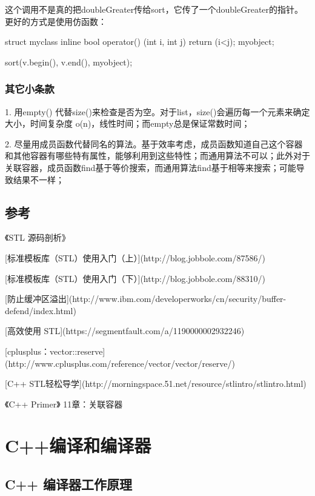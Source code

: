 这个调用不是真的把doubleGreater传给sort，它传了一个doubleGreater的指针。更好的方式是使用仿函数：

\begin{Code}
struct myclass {
	inline bool operator() (int i, int j) {
		return (i<j);
	}
} myobject;

sort(v.begin(), v.end(), myobject);
\end{Code}

\subsubsection {其它小条款}

1. 用empty()
 代替size()来检查是否为空。对于list，size()会遍历每一个元素来确定大小，时间复杂度 o(n)，线性时间；而empty总是保证常数时间；
 
2. 尽量用成员函数代替同名的算法。基于效率考虑，成员函数知道自己这个容器和其他容器有哪些特有属性，能够利用到这些特性；而通用算法不可以；此外对于关联容器，成员函数find基于等价搜索，而通用算法find基于相等来搜索；可能导致结果不一样；

\subsection{参考}  

《STL 源码剖析》  

[标准模板库（STL）使用入门（上）](http://blog.jobbole.com/87586/)
  
[标准模板库（STL）使用入门（下）](http://blog.jobbole.com/88310/) 

[防止缓冲区溢出](http://www.ibm.com/developerworks/cn/security/buffer-defend/index.html)

[高效使用 STL](https://segmentfault.com/a/1190000002932246)  

[cplusplus：vector::reserve](http://www.cplusplus.com/reference/vector/vector/reserve/)
  
[C++ STL轻松导学](http://morningspace.51.net/resource/stlintro/stlintro.html)  

《C++ Primer》 11章：关联容器  

\section{C++编译和编译器}

\subsection{C++ 编译器工作原理}

